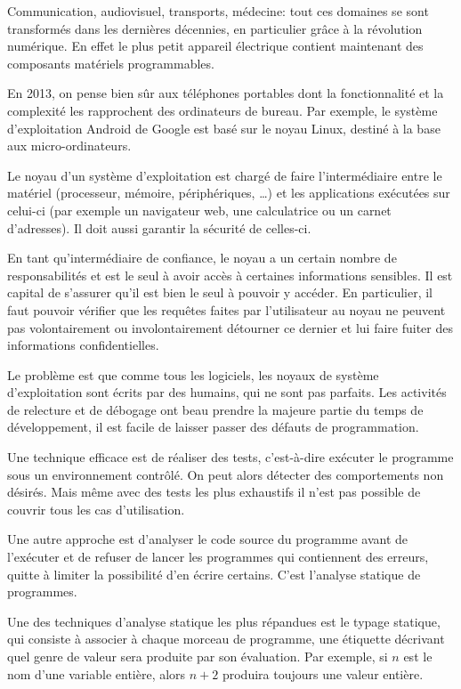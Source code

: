 Communication,
audiovisuel,
transports,
médecine:
tout ces domaines se sont transformés dans les dernières décennies,
en particulier grâce à la révolution numérique.
En effet le plus petit appareil électrique contient maintenant des composants
matériels programmables.

En 2013, on pense bien sûr aux téléphones portables dont la fonctionnalité et la
complexité les rapprochent des ordinateurs de bureau. Par exemple, le système
d'exploitation Android de Google est basé sur le noyau Linux, destiné à la base
aux micro-ordinateurs.

Le noyau d'un système d'exploitation est chargé de faire l'intermédiaire entre
le matériel (processeur, mémoire, périphériques, …) et les applications
exécutées sur celui-ci (par exemple un navigateur web, une calculatrice ou un
carnet d'adresses). Il doit aussi garantir la sécurité de celles-ci.

En tant qu'intermédiaire de confiance, le noyau a un certain nombre de
responsabilités et est le seul à avoir accès à certaines informations sensibles.
Il est capital de s'assurer qu'il est bien le seul à pouvoir y accéder. En
particulier, il faut pouvoir vérifier que les requêtes faites par l'utilisateur
au noyau ne peuvent pas volontairement ou involontairement détourner ce dernier
et lui faire fuiter des informations confidentielles.

Le problème est que comme tous les logiciels, les noyaux de système
d'exploitation sont écrits par des humains, qui ne sont pas parfaits. Les
activités de relecture et de débogage ont beau prendre la majeure partie du
temps de développement, il est facile de laisser passer des défauts de
programmation.

Une technique efficace est de réaliser des tests, c'est-à-dire exécuter le
programme sous un environnement contrôlé. On peut alors détecter des
comportements non désirés. Mais même avec des tests les plus exhaustifs il n'est
pas possible de couvrir tous les cas d'utilisation.

Une autre approche est d'analyser le code source du programme avant de
l'exécuter et de refuser de lancer les programmes qui contiennent des erreurs,
quitte à limiter la possibilité d'en écrire certains. C'est l'analyse statique
de programmes.

Une des techniques d'analyse statique les plus répandues est le typage statique,
qui consiste à associer à chaque morceau de programme, une étiquette
décrivant quel genre de valeur sera produite par son évaluation. Par exemple, si
$n$ est le nom d'une variable entière, alors $n + 2$ produira toujours une
valeur entière.

